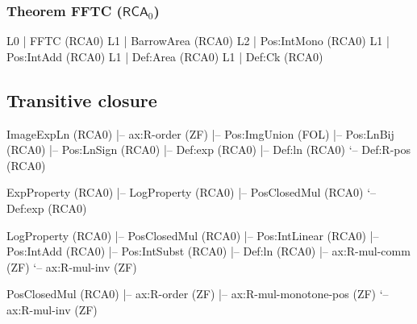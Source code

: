 \documentclass[11pt,reqno]{amsart}
\theoremstyle{redplain}
\begin{document}
\subsubsection*{Theorem \textsf{FFTC} ($\textsf{RCA}_0$)}
\begin{verbatimbox}
	L0 | FFTC                             (RCA0)
	L1 |   BarrowArea                     (RCA0)
	L2 |     Pos:IntMono                  (RCA0)
	L1 |   Pos:IntAdd                     (RCA0)
	L1 |   Def:Area                       (RCA0)
	L1 |   Def:Ck                         (RCA0)
\end{verbatimbox}

\subsection{Transitive closure}
\begin{verbatimbox}
	ImageExpLn                        (RCA0)
	|-- ax:R-order                    (ZF)
	|-- Pos:ImgUnion                  (FOL)
	|-- Pos:LnBij                     (RCA0)
	|-- Pos:LnSign                    (RCA0)
	|-- Def:exp                       (RCA0)
	|-- Def:ln                        (RCA0)
	`-- Def:R-pos                     (RCA0)
	
	ExpProperty                       (RCA0)
	|-- LogProperty                   (RCA0)
	|-- PosClosedMul                  (RCA0)
	`-- Def:exp                       (RCA0)
	
	LogProperty                       (RCA0)
	|-- PosClosedMul                  (RCA0)
	|-- Pos:IntLinear                 (RCA0)
	|-- Pos:IntAdd                    (RCA0)
	|-- Pos:IntSubst                  (RCA0)
	|-- Def:ln                        (RCA0)
	|-- ax:R-mul-comm                 (ZF)
	`-- ax:R-mul-inv                  (ZF)
	
	PosClosedMul                      (RCA0)
	|-- ax:R-order                    (ZF)
	|-- ax:R-mul-monotone-pos         (ZF)
	`-- ax:R-mul-inv                  (ZF)
\end{verbatimbox}
\end{document}
